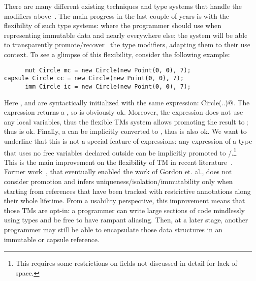 \noindent There are many different existing techniques and type systems that handle the modifiers above~\cite{ZibinEtAl10,ClarkeWrigstad03,HallerOdersky10,GordonEtAl12,ServettoZucca15}.
The main progress in the last couple of years is with the flexibility of such type systems:
 where the programmer should use \Q@imm@ when  representing immutable data
and \Q@mut@ nearly everywhere else; the system will be able to transparently promote/recover~\cite{GordonEtAl12,clebsch2015deny,ServettoZucca15} the type modifiers, adapting them to their use context.
To see a glimpse of this flexibility, consider the following example:
\saveSpace
\begin{lstlisting}
      mut Circle mc = new Circle(new Point(0, 0), 7);
capsule Circle cc = new Circle(new Point(0, 0), 7);
      imm Circle ic = new Circle(new Point(0, 0), 7);
\end{lstlisting}
\saveSpace
Here \Q@mc@, \Q@ic@ and \Q@cc@ are syntactically initialized with the same expression: \Q@new Circle(..)@.
The \Q@new@ expression returns a \Q@mut@, so \Q@mc@ is obviously ok.
Moreover, the expression does not use any \Q@mut@ local variables, thus the flexible TMs system
allows promoting the \Q@mut@ result to \Q@capsule@; thus \Q@cc@ is ok.
Finally, a \Q@capsule@ can be implicitly converted to \Q@imm@, thus \Q@ic@ is also ok.
We want to underline that this is not a special feature of \Q@new@ expressions:
any expression of a \Q@mut@ type that uses no free \Q@mut@ variables declared outside can be implicitly promoted to \Q@capsule@/\Q@imm@.\footnote{
This requires some restrictions on \Q@read@ fields not discussed in detail for lack of space.
} This is the main improvement on the flexibility of TM in recent literature~\cite{ServettoEtAl13a,ServettoZucca15,GordonEtAl12,clebsch2015deny,clebsch2017orca}.
Former work~\cite{Boyland10,boyland2003checking,Hogg91,Smith:2000:AT:645394.651903,DBLP:conf/pldi/AikenFKT03}, that eventually enabled the work of Gordon et. al., does not consider promotion and 
infers uniqueness/isolation/immutability only when starting from references that have been tracked with restrictive annotations along their whole lifetime.
From a usability perspective, this improvement means that
those TMs are opt-in: a programmer can write large sections of code
mindlessly using \Q@mut@ types and be free to have rampant aliasing. 
Then, at a later stage, another programmer may still 
be able to encapsulate those data structures in an immutable or capsule reference.

